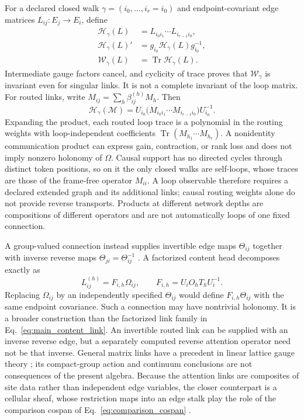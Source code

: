 \documentclass[twoside,11pt]{article}
\begin{document}
For a declared closed walk \(\gamma=(i_0,\ldots,i_r=i_0)\) and endpoint-covariant edge matrices \(L_{ij}:E_j\to E_i\), define
\begin{align}
\mathcal H_\gamma(L)&=L_{i_0i_1}\cdots L_{i_{r-1}i_0},\\
\mathcal H_\gamma(L)'&=g_{i_0}\mathcal H_\gamma(L)g_{i_0}^{-1},\\
\mathcal W_\gamma(L)&=\operatorname{Tr}\mathcal H_\gamma(L).
\label{eq:main_matrix_loop_trace}
\end{align}
Intermediate gauge factors cancel, and cyclicity of trace proves that \(\mathcal W_\gamma\) is invariant even for singular links. It is not a complete invariant of the loop matrix. For routed links, write \(M_{ij}=\sum_h\beta_{ij}^{(h)}M_h\). Then
\begin{equation}
\mathcal H_\gamma(\mathcal M)
=U_{i_0}\bigl(M_{i_0i_1}\cdots M_{i_{r-1}i_0}\bigr)U_{i_0}^{-1}.
\label{eq:main_routed_loop_body}
\end{equation}
Expanding the product, each routed loop trace is a polynomial in the routing weights with loop-independent coefficients \(\operatorname{Tr}(M_{h_1}\cdots M_{h_r})\). A nonidentity communication product can express gain, contraction, or rank loss and does not imply nonzero holonomy of \(\Omega\). Causal support has no directed cycles through distinct token positions, so on it the only closed walks are self-loops, whose traces are those of the frame-free operator \(M_{ii}\). A loop observable therefore requires a declared extended graph and its additional links; causal routing weights alone do not provide reverse transports. Products at different network depths are compositions of different operators and are not automatically loops of one fixed connection.

A group-valued connection instead supplies invertible edge maps $\Theta_{ij}$ together with inverse reverse maps $\Theta_{ji}=\Theta_{ij}^{-1}$ \citep{WilsonConfinement1974}. A factorized content head decomposes exactly as
\begin{equation}
L_{ij}^{(h)}=F_{i,h}\Omega_{ij},\qquad
F_{i,h}=U_iO_hT_hU_i^{-1}.
\label{eq:main_processing_transport}
\end{equation}
Replacing $\Omega_{ij}$ by an independently specified $\Theta_{ij}$ would define $F_{i,h}\Theta_{ij}$ with the same endpoint covariance. Such a connection may have nontrivial holonomy. It is a broader construction than the factorized link family in Eq.~\eqref{eq:main_content_link}. An invertible routed link can be supplied with an inverse reverse edge, but a separately computed reverse attention operator need not be that inverse. General matrix links have a precedent in linear lattice gauge theory \citep{Wetterich2014LinearLattice}; its compact-group action and continuum conclusions are not consequences of the present algebra. Because the attention links are composites of site data rather than independent edge variables, the closer counterpart is a cellular sheaf, whose restriction maps into an edge stalk play the role of the comparison cospan of Eq.~\eqref{eq:comparison_cospan} \citep{HansenGhrist2019,Bodnar2022NeuralSheaf}.
\end{document}
